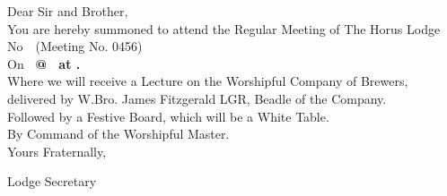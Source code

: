 \documentclass[11pt,a4paper]{article}
\providecommand{\MeetingNumber}{0456}
\begin{document}
{\HorusBodyFont
Dear Sir and Brother,\\[10pt]
You are hereby summoned to attend the Regular Meeting of The Horus Lodge No~\LodgeNumber~(Meeting No. \MeetingNumber)\\[8pt]
On \textbf{\MeetingDate\ @ \MeetingTyling\ at \MeetingVenue.}\\[10pt]
Where we will receive a Lecture on the Worshipful Company of Brewers, delivered by W.Bro. James Fitzgerald LGR, Beadle of the Company.\\[10pt]
Followed by a Festive Board, which will be a White Table.\\[10pt]
By Command of the Worshipful Master.\\[22pt]
Yours Fraternally,\\[14pt]
\begin{minipage}[t]{0.56\textwidth}
  {\SignatureNameFont 
    \if\relax\detokenize\expandafter{\SecretaryDisplayName}\relax
      \if\relax\detokenize\expandafter{\SecretaryName}\relax
      \else
        \SecretarySalutation\space\SecretaryName
      \fi
    \else
      \SecretaryDisplayName
    \fi
  }\par\vspace{2pt}
  {\SignatureRanksFont 
    \if\relax\detokenize\expandafter{\SecretaryPostnominalsOverride}\relax
      \FormatPostNominals{\SecretaryCraftGrandRank}{\SecretaryCraftRanks}{\SecretaryRAGrandRank}{\SecretaryRARanks}%
    \else
      \SecretaryPostnominalsOverride
    \fi
  }\par\vspace{2pt}
  {\SignatureRoleFont Lodge Secretary}
\end{minipage}\hfill
\begin{minipage}[t]{0.34\textwidth}\raggedleft
  {\AddressFont \SecretaryAddressLineA}\par\vspace{2pt}
  {\AddressFont \SecretaryAddressLineB}\par\vspace{2pt}
  {\AddressFont \SecretaryAddressLineC}\par\vspace{2pt}
  {\ContactFont 
    \if\relax\detokenize\expandafter{\SecretaryPhoneOverride}\relax
      \edef\PhoneVal{\SecretaryPhone}%
}
\end{minipage}}
\end{document}
